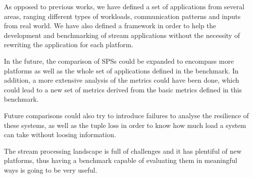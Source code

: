 \documentclass[ppgc,diss,english]{iiufrgs}
\begin{document}
As opposed to previous works, we have defined a set of applications from several areas, ranging different types of workloads, communication patterns and inputs from real world. We have also defined a framework in order to help the development and benchmarking of stream applications without the necessity of rewriting the application for each platform.

In the future, the comparison of SPSs could be expanded to encompass more platforms as well as the whole set of applications defined in the benchmark. In addition, a more extensive analysis of the metrics could have been done, which could lead to a new set of metrics derived from the basic metrics defined in this benchmark.

Future comparisons could also try to introduce failures to analyse the resilience of these systems, as well as the tuple loss in order to know how much load a system can take without loosing information.

The stream processing landscape is full of challenges and it has plentiful of new platforms, thus having a benchmark capable of evaluating them in meaningful ways is going to be very useful.




\end{document}
